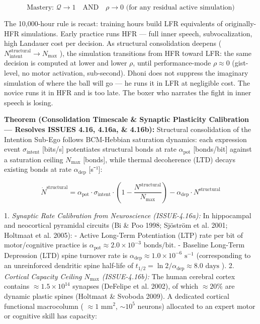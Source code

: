 \documentclass[11pt,a4paper]{article}
\theoremstyle{definition}
\theoremstyle{remark}
\begin{document}
\begin{equation}
\boxed{\text{Mastery: } \mathcal{Q} \to 1 \quad \text{AND} \quad \rho \to 0 \text{ (for any residual active simulation)}}
\end{equation}


The 10,000-hour rule is recast: training hours build LFR equivalents of originally-HFR simulations. Early practice runs HFR — full inner speech, subvocalization, high Landauer cost per decision. As structural consolidation deepens ( $N_{\text{intent}}^{\text{structural}} \to N_{\text{max}}$ ), the simulation transitions from HFR toward LFR: the same decision is computed at lower and lower $\rho$, until performance-mode $\rho \approx 0$ (gist-level, no motor activation, sub-second). Dhoni does not suppress the imaginary simulation of where the ball will go — he runs it in LFR at negligible cost. The novice runs it in HFR and is too late. The boxer who narrates the fight in inner speech is losing.

\textbf{Theorem (Consolidation Timescale \& Synaptic Plasticity Calibration — Resolves ISSUES 4.16, 4.16a, \& 4.16b):} Structural consolidation of the Intention Sub-Ego follows BCM-Hebbian saturation dynamics: each expression event $\sigma_{\text{intent}}$ [bits/s] potentiates structural bonds at rate $\alpha_{\text{pot}}$ [bonds/bit] against a saturation ceiling $N_{\text{max}}$ [bonds], while thermal decoherence (LTD) decays existing bonds at rate $\alpha_{\text{dep}}$ [s⁻¹]:


\begin{equation}
\boxed{\dot{N}^{\text{structural}} = \alpha_{\text{pot}} \cdot \sigma_{\text{intent}} \cdot \left(1 - \frac{N^{\text{structural}}}{N_{\text{max}}}\right) - \alpha_{\text{dep}} \cdot N^{\text{structural}}}
\end{equation}


1. \textit{Synaptic Rate Calibration from Neuroscience (ISSUE-4.16a):} In hippocampal and neocortical pyramidal circuits (Bi \& Poo 1998; Sjöström et al. 2001; Holtmaat et al. 2005):
- Active Long-Term Potentiation (LTP) rate per bit of motor/cognitive practice is $\alpha_{\text{pot}} \approx 2.0 \times 10^{-3}\text{ bonds/bit}$.
- Baseline Long-Term Depression (LTD) spine turnover rate is $\alpha_{\text{dep}} \approx 1.0 \times 10^{-6}\text{ s}^{-1}$ (corresponding to an unreinforced dendritic spine half-life of $t_{1/2} = \ln 2 / \alpha_{\text{dep}} \approx 8.0\text{ days}$ ).
2. \textit{Cortical Capacity Ceiling $N_{\max}$ (ISSUE-4.16b):} The human cerebral cortex contains $\approx 1.5 \times 10^{14}$ synapses (DeFelipe et al. 2002), of which $\approx 20\%$ are dynamic plastic spines (Holtmaat \& Svoboda 2009). A dedicated cortical functional macrocolumn ( $\approx 1\text{ mm}^2$, $\sim 10^5$ neurons) allocated to an expert motor or cognitive skill has capacity:
\end{document}
